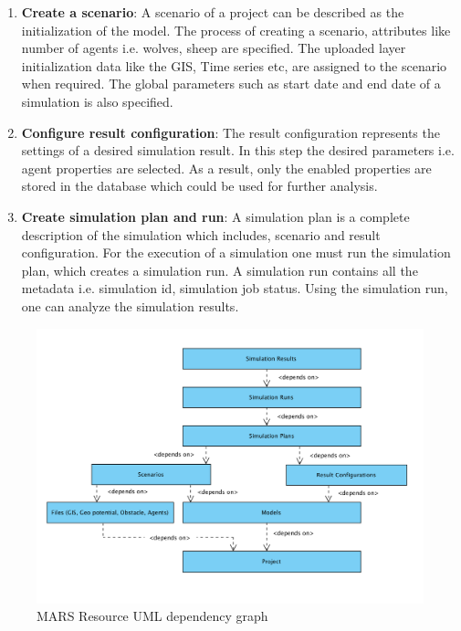 \begin{enumerate}
            \item 
                \textbf{Create a scenario}: A scenario of a project can be described as the initialization of the model.
                The process of creating a scenario, attributes like number of agents i.e. wolves, sheep are specified. 
                The uploaded layer initialization data like the GIS, Time series etc, are assigned to the scenario when required. 
                The global parameters such as start date and end date of a simulation is also specified.

            \item 
                \textbf{Configure result configuration}: The result configuration represents the settings of a desired simulation result. In this step the desired parameters
                i.e. agent properties are selected. As a result, only the enabled properties are stored in the database which could be used for further analysis.

            \item  
                \textbf{Create simulation plan and run}: A simulation plan is a complete description of the
                 simulation which includes, scenario and result configuration. For the execution of a simulation
                 one must run the simulation plan, which creates
                 a simulation run. A simulation run contains all the metadata i.e. simulation id, simulation 
                 job status. Using the simulation run, one can analyze the 
                 simulation results.
        \end{enumerate} 
        
        \begin{figure}[H]
            \centering \includegraphics[scale=0.6]{grafiken/marsDependency.png}
            \caption{MARS Resource UML dependency graph}
            \label{fig:marsDependency}
        \end{figure}
        
